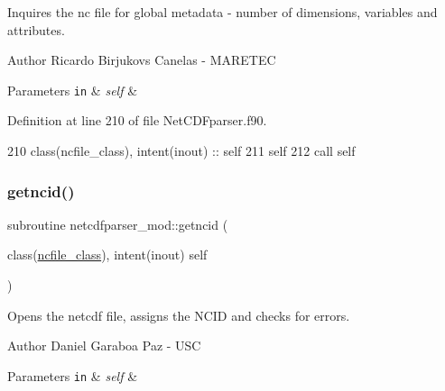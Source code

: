 Inquires the nc file for global metadata -\/ number of dimensions, variables and attributes. 

\begin{DoxyAuthor}{Author}
Ricardo Birjukovs Canelas -\/ M\+A\+R\+E\+T\+EC 
\end{DoxyAuthor}

\begin{DoxyParams}[1]{Parameters}
\mbox{\tt in}  & {\em self} & \\
\hline
\end{DoxyParams}


Definition at line 210 of file Net\+C\+D\+Fparser.\+f90.


\begin{DoxyCode}
210     \textcolor{keywordtype}{class}(ncfile\_class), \textcolor{keywordtype}{intent(inout)} :: self
211     self%
212     \textcolor{keyword}{call }self%
\end{DoxyCode}
\mbox{\label{namespacenetcdfparser__mod_a741dd5b5985255e73aa9d3cf08755e91}} 
\subsubsection{\texorpdfstring{getncid()}{getncid()}}
{\footnotesize\ttfamily subroutine netcdfparser\+\_\+mod\+::getncid (\begin{DoxyParamCaption}\item[{class(\mbox{\hyperlink{structnetcdfparser__mod_1_1ncfile__class}{ncfile\+\_\+class}}), intent(inout)}]{self }\end{DoxyParamCaption})\hspace{0.3cm}{\ttfamily [private]}}



Opens the netcdf file, assigns the N\+C\+ID and checks for errors. 

\begin{DoxyAuthor}{Author}
Daniel Garaboa Paz -\/ U\+SC 
\end{DoxyAuthor}

\begin{DoxyParams}[1]{Parameters}
\mbox{\tt in}  & {\em self} & \\
\hline
\end{DoxyParams}


